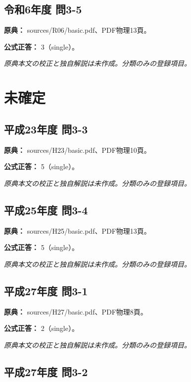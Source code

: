 \subsection{令和6年度 問3-5}
\label{q:r06-reg-basic-3-5}

\noindent\textbf{原典：} sources/R06/basic.pdf、PDF物理13頁。

\textbf{公式正答：} 3（single）。

\par\textit{原典本文の校正と独自解説は未作成。分類のみの登録項目。}

\section{未確定}

\subsection{平成23年度 問3-3}
\label{q:h23-reg-basic-3-3}

\noindent\textbf{原典：} sources/H23/basic.pdf、PDF物理10頁。

\textbf{公式正答：} 5（single）。

\par\textit{原典本文の校正と独自解説は未作成。分類のみの登録項目。}

\subsection{平成25年度 問3-4}
\label{q:h25-reg-basic-3-4}

\noindent\textbf{原典：} sources/H25/basic.pdf、PDF物理13頁。

\textbf{公式正答：} 5（single）。

\par\textit{原典本文の校正と独自解説は未作成。分類のみの登録項目。}

\subsection{平成27年度 問3-1}
\label{q:h27-reg-basic-3-1}

\noindent\textbf{原典：} sources/H27/basic.pdf、PDF物理8頁。

\textbf{公式正答：} 2（single）。

\par\textit{原典本文の校正と独自解説は未作成。分類のみの登録項目。}

\subsection{平成27年度 問3-2}
\label{q:h27-reg-basic-3-2}

